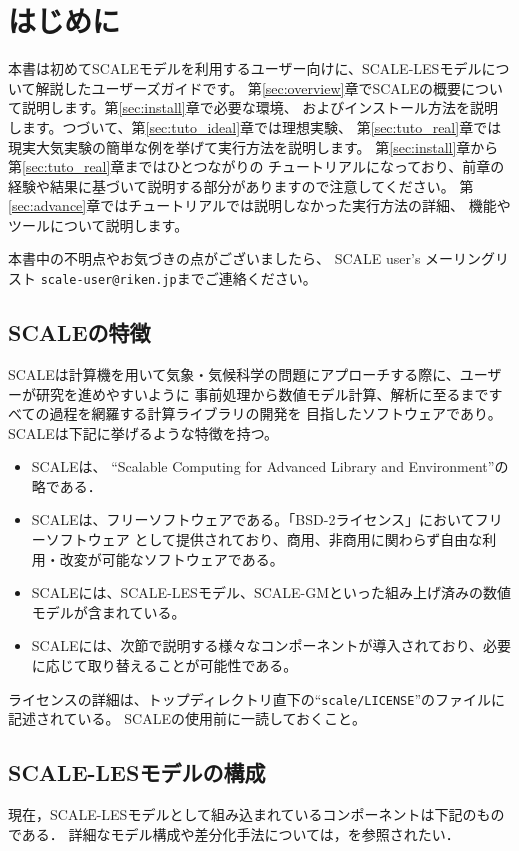 \section{はじめに}

本書は初めてSCALEモデルを利用するユーザー向けに、SCALE-LESモデルについて解説したユーザーズガイドです。
第\ref{sec:overview}章でSCALEの概要について説明します。第\ref{sec:install}章で必要な環境、
およびインストール方法を説明します。つづいて、第\ref{sec:tuto_ideal}章では理想実験、
第\ref{sec:tuto_real}章では現実大気実験の簡単な例を挙げて実行方法を説明します。
第\ref{sec:install}章から第\ref{sec:tuto_real}章まではひとつながりの
チュートリアルになっており、前章の経験や結果に基づいて説明する部分がありますので注意してください。
第\ref{sec:advance}章ではチュートリアルでは説明しなかった実行方法の詳細、
機能やツールについて説明します。

本書中の不明点やお気づきの点がございましたら、
SCALE user's メーリングリスト \verb|scale-user@riken.jp|までご連絡ください。



\subsection{SCALEの特徴}
SCALEは計算機を用いて気象・気候科学の問題にアプローチする際に、ユーザーが研究を進めやすいように
事前処理から数値モデル計算、解析に至るまですべての過程を網羅する計算ライブラリの開発を
目指したソフトウェアであり。SCALEは下記に挙げるような特徴を持つ。
\begin{itemize}
\item SCALEは、 ``Scalable Computing for Advanced Library and Environment''の略である．
\item SCALEは、フリーソフトウェアである。「BSD-2ライセンス」においてフリーソフトウェア
として提供されており、商用、非商用に関わらず自由な利用・改変が可能なソフトウェアである。
\item SCALEには、SCALE-LESモデル、SCALE-GMといった組み上げ済みの数値モデルが含まれている。
\item SCALEには、次節で説明する様々なコンポーネントが導入されており、必要に応じて取り替えることが可能性である。
\end{itemize}

ライセンスの詳細は、トップディレクトリ直下の``\verb|scale/LICENSE|''のファイルに記述されている。
SCALEの使用前に一読しておくこと。

\subsection{SCALE-LESモデルの構成}
現在，SCALE-LESモデルとして組み込まれているコンポーネントは下記のものである．
詳細なモデル構成や差分化手法については，\cite{scale_2015}を参照されたい．\\

